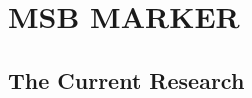 \documentclass[man, 12pt, a4paper,  donotrepeattitle, floatsintext, draftfirst]{apa7}
\begin{document}
\section{MSB MARKER}





\subsection{The Current Research}
\end{document}
